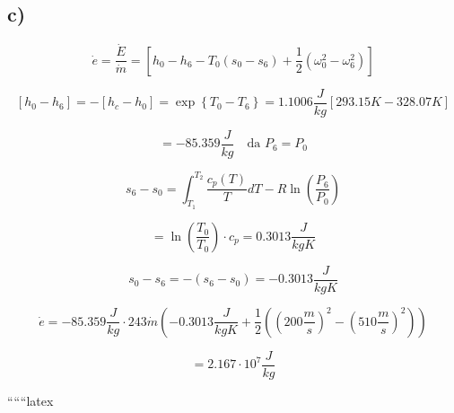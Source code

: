 

\subsection*{c)}

\begin{equation*}
    \dot{e} = \frac{\dot{E}}{\dot{m}} = \left[ h_0 - h_6 - T_0 (s_0 - s_6) + \frac{1}{2} (\omega_0^2 - \omega_6^2) \right]
\end{equation*}

\begin{equation*}
    \left[ h_0 - h_6 \right] = - \left[ h_c - h_0 \right] = \exp \left\{ T_0 - T_6 \right\} = 1.1006 \frac{J}{kg} \left[ 293.15 K - 328.07 K \right]
\end{equation*}

\begin{equation*}
    = -85.359 \frac{J}{kg} \quad \text{da } P_6 = P_0
\end{equation*}

\begin{equation*}
    s_6 - s_0 = \int_{T_1}^{T_2} \frac{c_p(T)}{T} dT - R \ln \left( \frac{P_6}{P_0} \right)
\end{equation*}

\begin{equation*}
    = \ln \left( \frac{T_0}{T_0} \right) \cdot c_p = 0.3013 \frac{J}{kgK}
\end{equation*}

\begin{equation*}
    s_0 - s_6 = - (s_6 - s_0) = -0.3013 \frac{J}{kgK}
\end{equation*}

\begin{equation*}
    \dot{e} = -85.359 \frac{J}{kg} \cdot 243 \dot{m} \left( -0.3013 \frac{J}{kgK} + \frac{1}{2} \left( (200 \frac{m}{s})^2 - (510 \frac{m}{s})^2 \right) \right)
\end{equation*}

\begin{equation*}
    = 2.167 \cdot 10^7 \frac{J}{kg}
\end{equation*}

``````latex